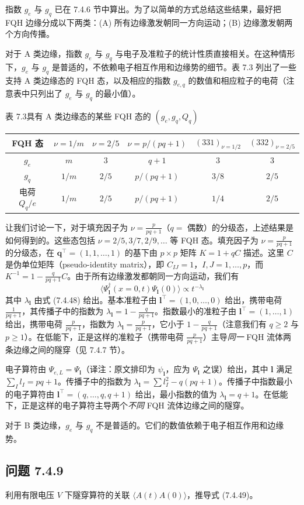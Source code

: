 指数 $g_{e}$ 与 $g_{q}$ 已在 7.4.6 节中算出。为了以简单的方式总结这些结果，最好把 FQH 边缘分成以下两类：(A) 所有边缘激发朝同一方向运动；(B) 边缘激发朝两个方向传播。

对于 A 类边缘，指数 $g_{e}$ 与 $g_{q}$ 与电子及准粒子的统计性质直接相关。在这种情形下，$g_{e}$ 与 $g_{q}$ 是普适的，不依赖电子相互作用和边缘势的细节。表 7.3 列出了一些支持 A 类边缘态的 FQH 态，以及相应的指数 $g_{e,q}$ 的数值和相应粒子的电荷（注意表中只列出了 $g_{e}$ 与 $g_{q}$ 的最小值）。

\begin{center}
\small 表 7.3\quad 具有 A 类边缘态的某些 FQH 态的 $(g_{e},g_{q},Q_{q})$\\[6pt]
\begin{tabular}{cccccc}
\toprule
FQH 态 & $\nu=1/m$ & $\nu=2/5$ & $\nu=p/(pq+1)$ & $(331)_{\nu=1/2}$ & $(332)_{\nu=2/5}$ \\
\midrule
$g_{e}$ & $m$ & $3$ & $q+1$ & $3$ & $3$ \\
$g_{q}$ & $1/m$ & $2/5$ & $p/(pq+1)$ & $3/8$ & $2/5$ \\
电荷 $Q_{q}/e$ & $1/m$ & $2/5$ & $p/(pq+1)$ & $1/4$ & $2/5$ \\
\bottomrule
\end{tabular}
\end{center}

让我们讨论一下，对于填充因子为 $\nu=\frac{p}{pq+1}$（$q=$ 偶数）的分级态，上述结果是如何得到的。这些态包括 $\nu=2/5,3/7,2/9,\ldots$ 等 FQH 态。填充因子为 $\nu=\frac{p}{pq+1}$ 的分级态，在 $\pmb{q}^{\top}=(1,1,\ldots,1)$ 的基下由 $p\times p$ 矩阵 $K=1+qC$ 描述。这里 $C$ 是伪单位矩阵（pseudo-identity matrix），即 $C_{IJ}=1$，$I,J=1,\ldots,p$，而 $K^{-1}=1-\frac{q}{pq+1}C$。由于所有边缘激发都朝同一方向运动，我们有
\begin{equation*}
\langle\Psi_{\pmb{l}}^{\dagger}(x=0,t)\Psi_{\pmb{l}}(0)\rangle\propto t^{-\lambda_{\pmb{l}}}
\end{equation*}
其中 $\lambda_{\pmb{l}}$ 由式 (7.4.48) 给出。基本准粒子由 $\pmb{l}^{\top}=(1,0,\ldots,0)$ 给出，携带电荷 $\frac{1}{pq+1}$，其传播子中的指数为 $\lambda_{\pmb{l}}=1-\frac{q}{pq+1}$。指数最小的准粒子由 $\pmb{l}^{\top}=(1,\ldots,1)$ 给出，携带电荷 $\frac{p}{pq+1}$，指数为 $\lambda_{\pmb{l}}=\frac{p}{pq+1}$，它小于 $1-\frac{q}{pq+1}$（注意我们有 $q\geqslant2$ 与 $p\geqslant1$）。在低能下，正是这样的准粒子（携带电荷 $\frac{p}{pq+1}$）主导\emph{同一} FQH 流体两条边缘之间的隧穿（见 7.4.7 节）。

电子算符由 $\Psi_{e,L}=\Psi_{\pmb{l}}$（译注：原文排印为 $\psi_{\pmb{l}}$，应为 $\Psi_{\pmb{l}}$ 之误）给出，其中 $\pmb{l}$ 满足 $\sum_{I}l_{I}=pq+1$。传播子中的指数为 $\lambda_{\pmb{l}}=\sum l_{I}^{2}-q(pq+1)$。传播子中指数最小的电子算符由 $\pmb{l}^{\top}=(q,\ldots,q,q+1)$ 给出，最小指数的值为 $\lambda_{\pmb{l}}=q+1$。在低能下，正是这样的电子算符主导两个\emph{不同} FQH 流体边缘之间的隧穿。

对于 B 类边缘，$g_{e}$ 与 $g_{q}$ 不是普适的。它们的数值依赖于电子相互作用和边缘势。

\subsection*{问题 7.4.9}
利用有限电压 $V$ 下隧穿算符的关联 $\langle A(t)A(0)\rangle$，推导式 (7.4.49)。
